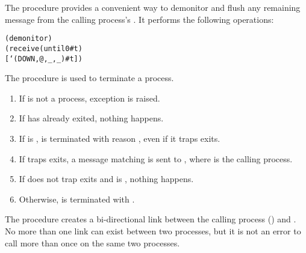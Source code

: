 The  procedure provides a convenient way to
demonitor and flush any remaining  message from the
calling process's . It performs the following operations:
\antipar\begin{alltt}
(demonitor )
(receive (until 0 #t)
  [`(DOWN ,@ ,_ ,_) #t])
\end{alltt}

\begin{procedure}
\end{procedure}
\returns{} 

The  procedure is used to terminate a process.
\begin{enumerate}
\item If  is not a process, exception  is raised.
\item If  has already exited, nothing happens.
\item If  is ,  is terminated
  with reason , even if it traps exits.
\item If  traps exits, a message matching  is sent to , where  is the
  calling process.
\item If  does not trap exits and  is
  , nothing happens.
\item Otherwise,  is terminated with .
\end{enumerate}

\begin{procedure}
\end{procedure}
\returns{} 

The  procedure creates a bi-directional link between the
calling process () and . No more than one link
can exist between two processes, but it is not an error to call
 more than once on the same two processes.

